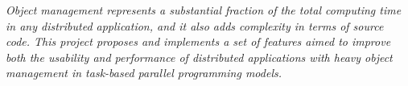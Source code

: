 \textit{Object management represents a substantial fraction of the total computing time in any distributed application, and it also adds complexity in terms of source code. This project proposes and implements a set of features aimed to improve both the usability and performance of distributed applications with heavy object management in task-based parallel programming models.}